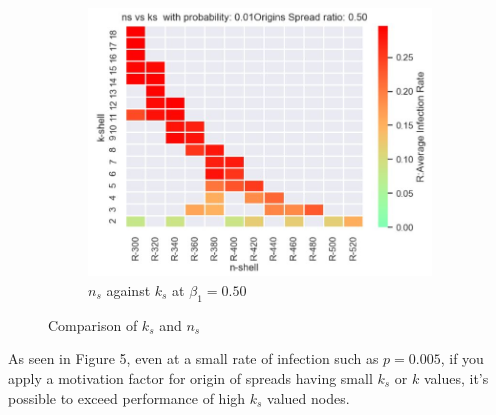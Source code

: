\documentclass[11pt,a4,twocolumn]{article}
\begin{document}
\begin{figure}[h]
\begin{subfigure}{.5\textwidth}
	\centerline{\includegraphics[scale=.4]{ns-ks-01-50.jpg}}
	\caption{$n_{s}$ against $k_{s}$ at ${\beta}_{1} = 0.50$}
	\label{fig:fig2}
\end{subfigure}
\caption{Comparison of $k_{s}$ and $n_{s}$}
\label{fig:fig}
\end{figure}

As seen in Figure 5, even at a small rate of infection such as $p=0.005$, if you apply a motivation factor for origin of spreads having small  $k_{s}$ or  $k$ values, it's possible to exceed performance of high  $k_{s}$ valued nodes.  
\end{document}
